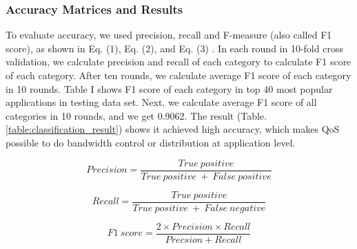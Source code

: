 \documentclass[journal]{IEEEtran}
\begin{document}
\subsubsection{Accuracy Matrices and Results}
To evaluate accuracy, we used precision, recall and F-measure (also called F1 score),
as shown in Eq. (1), Eq. (2), and Eq. (3) \cite{muc4}. In each round in 10-fold cross validation,
we calculate precision and recall of each category to calculate F1 score of each category.
After ten rounds, we calculate average F1 score of each category in 10 rounds. Table I shows F1 score of each category in top 40 most popular applications in testing data set. Next, we calculate average F1 score of all categories in 10 rounds, and we get 0.9062. The result (Table. \ref{table:classification_result}) shows it achieved high accuracy, which makes QoS possible to do bandwidth control or distribution at application level.


\begin{equation}
\label{eqn_1}
Precision = \dfrac{True\ positive}{True\ positive\ +\ False\ positive}
\end{equation}

\begin{equation}
\label{eqn_2}
Recall = \dfrac{True\ positive}{True\ positive\ +\ False\ negative}
\end{equation}

\begin{equation}
\label{eqn_3}
F1\ score = \dfrac{2\times Precision\times Recall}{Precsion + Recall}
\end{equation}
\end{document}
